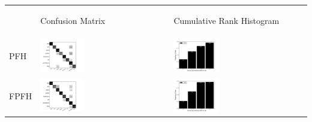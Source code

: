 
\begin{table}
\centering
\begin{tabular}{m{} m{} m{}}
  & \begin{center} Confusion Matrix \end{center} & \begin{center} Cumulative Rank Histogram \end{center} \\
  PFH & \includegraphics[width=0.35\textwidth,clip=true]{../figures/PSB/PFH_confmat.png} & \includegraphics[width=0.35\textwidth,clip=true]{../figures/PSB/PFH_rankhist.png} \\
  FPFH & \includegraphics[width=0.35\textwidth,clip=true]{../figures/PSB/FPFH_confmat.png} & \includegraphics[width=0.35\textwidth,clip=true]{../figures/PSB/FPFH_rankhist.png} \\

\end{tabular}
\end{table}
